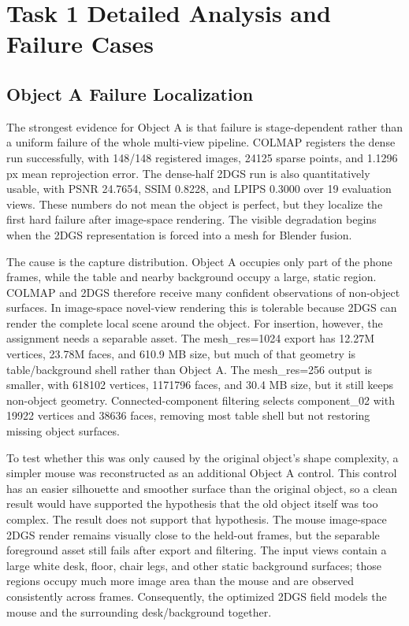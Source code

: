 \documentclass[10pt,twocolumn,letterpaper]{article}
\begin{document}
\section{Task 1 Detailed Analysis and Failure Cases}

\subsection{Object A Failure Localization}
The strongest evidence for Object A is that failure is stage-dependent rather than a uniform failure of the whole multi-view pipeline.
COLMAP registers the dense run successfully, with 148/148 registered images, 24125 sparse points, and 1.1296 px mean reprojection error.
The dense-half 2DGS run is also quantitatively usable, with PSNR 24.7654, SSIM 0.8228, and LPIPS 0.3000 over 19 evaluation views.
These numbers do not mean the object is perfect, but they localize the first hard failure after image-space rendering.
The visible degradation begins when the 2DGS representation is forced into a mesh for Blender fusion.

The cause is the capture distribution.
Object A occupies only part of the phone frames, while the table and nearby background occupy a large, static region.
COLMAP and 2DGS therefore receive many confident observations of non-object surfaces.
In image-space novel-view rendering this is tolerable because 2DGS can render the complete local scene around the object.
For insertion, however, the assignment needs a separable asset.
The mesh\_res=1024 export has 12.27M vertices, 23.78M faces, and 610.9 MB size, but much of that geometry is table/background shell rather than Object A.
The mesh\_res=256 output is smaller, with 618102 vertices, 1171796 faces, and 30.4 MB size, but it still keeps non-object geometry.
Connected-component filtering selects component\_02 with 19922 vertices and 38636 faces, removing most table shell but not restoring missing object surfaces.

To test whether this was only caused by the original object's shape complexity, a simpler mouse was reconstructed as an additional Object A control.
This control has an easier silhouette and smoother surface than the original object, so a clean result would have supported the hypothesis that the old object itself was too complex.
The result does not support that hypothesis.
The mouse image-space 2DGS render remains visually close to the held-out frames, but the separable foreground asset still fails after export and filtering.
The input views contain a large white desk, floor, chair legs, and other static background surfaces; those regions occupy much more image area than the mouse and are observed consistently across frames.
Consequently, the optimized 2DGS field models the mouse and the surrounding desk/background together.
\end{document}
